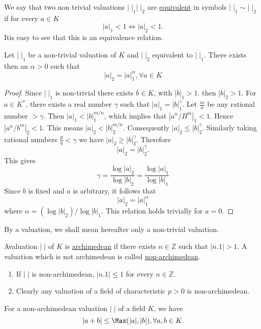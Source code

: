 We say that two non trivial valuations $|\;|_1|\;|_2$ are 
\underline{equivalent} in symbols $|\;|_1\sim |\;|_2$ if for every 
$a\in K$
$$
|a|_1<1\Leftrightarrow |a|_2<1.
$$
It\pageoriginale is easy to see that this is an equivalence relation.
\begin{prop}\label{prop:0.1}
Let $|\;|_1$ be a non-trivial valuation of $K$ and $|\;|_2$ equivalent 
to $|\;|_1$. There exists then an $\alpha >0$ such that 
$$
|a|_2=|a|_1^\alpha, \forall a\in K
$$
\end{prop}
\begin{proof}
Since $|\;|_1$ is non-trivial there exists $b\in K$, with $|b|_1>1$. 
then $|b|_2>1$. For $a\in K^*$, there exists a real number $\gamma$ 
such that $|a|_1=|b|_1^\gamma$. Let $\frac{m}{n}$ be any rational 
number $>\gamma$. Then $|a|_1<|b|_1^{m/n}$, which implies that 
$|a^n/B^m|_1<1$. Hence $|a^n/b^m|_2<1$. This means 
$|a|_2<|b|_2^{m/n}$. Consequently $|a|_2\leq |b|_2^\gamma$. Similarly 
taking rational numbers $\frac{p}{q}<\gamma$ we have $|a|_2\geq 
|b|_2^\gamma$. Therefore
$$
|a|_2=|b|_2^\gamma.
$$
This gives
$$
\gamma=\frac{\log |a|_2}{\log |b|_2}=\frac{\log |a|_1}{\log |b|_1}
$$
Since $b$ is fixed and $a$ is arbitrary, it follows that
$$
|a|_2=|a|_1^\alpha
$$
where $\alpha =(\log |b|_2)/\log |b|_1$. This relation holds trivially 
for $a=0$.
\end{proof}

By a valuation, we shall mean hereafter only a non-trivial valuation.

\begin{defi*}
A\pageoriginale valuation $|\;|$ of $K$ is \underline{archimedean} if 
there exists 
$n\in\mathbb{Z}$ such that $|n.1|>1$. A valuation which is not 
archimedean is called \underline{non-archimedean}.
\end{defi*}

\begin{remarks*}
\begin{enumerate}[1)]
\item If $|\;|$ is non-archimedean, $|n.1|\leq 1$ for every $n\in 
\mathbb{Z}$.
\item Clearly any valuation of a field of characteristic $p>0$ is 
non-archimedean.
\end{enumerate}
\end{remarks*}

\begin{prop}\label{prop:0.2}
For a non-archimedean valuation $|\;|$ of a field $K$, we have 
$$
|a+b|\leq\Max (|a|,|b|),\forall a, b \in K.
$$
\end{prop}


